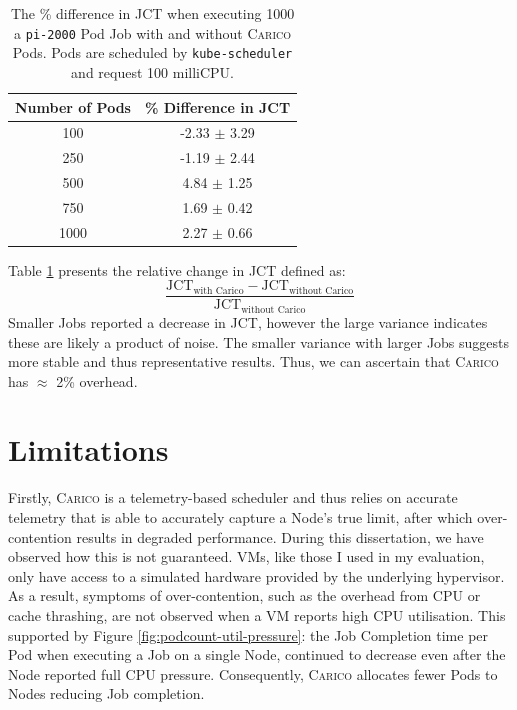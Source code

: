 \begin{table}[ht!]
\centering
    \begin{tabular}{|c|c|}
    \hline
    \textbf{Number of Pods} & \textbf{\% Difference in JCT} \\
    \hline
        100 & -2.33 $\pm$ 3.29 \\
        250 & -1.19 $\pm$ 2.44 \\
        500 & 4.84  $\pm$ 1.25 \\
        750 & 1.69  $\pm$ 0.42 \\
        1000 & 2.27  $\pm$ 0.66 \\
    \hline
    \end{tabular}
    \caption{The \% difference in JCT when executing 1000 a \texttt{pi-2000}
    Pod Job with and without \textsc{Carico} Pods. Pods are scheduled by
    \texttt{kube-scheduler} and request 100 milliCPU.}
    \label{tab:overhead}
\end{table}

Table \ref{tab:overhead} presents the relative change in JCT defined as:
\[
\frac{\text{JCT}_{\text{with Carico}} - \text{JCT}_{\text{without
Carico}}}{\text{JCT}_{\text{without Carico}}}
\]
Smaller Jobs reported a decrease
in JCT, however the large variance indicates these are likely a product of
noise. The smaller variance with larger Jobs suggests more stable and thus
representative results. Thus, we can ascertain that \textsc{Carico} has
$\approx$ 2\% overhead.

\section{Limitations}

Firstly, \textsc{Carico} is a telemetry-based scheduler and thus relies on accurate
telemetry that is able to accurately capture a Node's true limit, after which
over-contention results in degraded performance. During this dissertation, we
have observed how this is not guaranteed. VMs, like those I used in my
evaluation, only have access to a simulated hardware provided by the underlying
hypervisor. As a result, symptoms of over-contention, such as the overhead from
CPU or cache thrashing, are not observed when a VM reports high CPU utilisation.
This supported by Figure \ref{fig:podcount-util-pressure}: the Job Completion
time per Pod when executing a Job on a single Node, continued to decrease even
after the Node reported full CPU pressure. Consequently, \textsc{Carico}
allocates fewer Pods to Nodes reducing Job completion.

